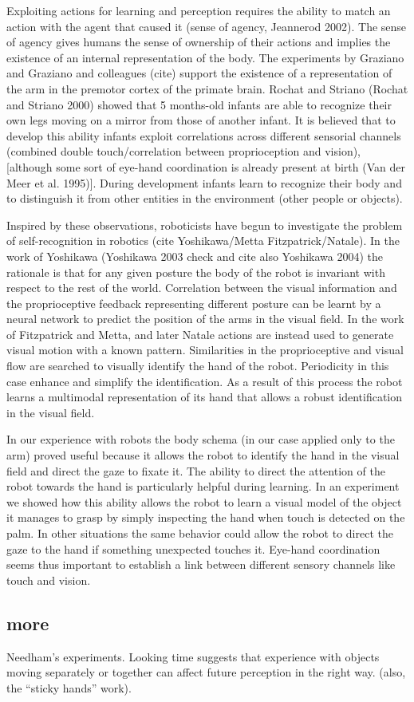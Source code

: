Exploiting actions for learning and perception requires the ability to match an action with the agent that caused it (sense of agency, Jeannerod 2002). The sense of agency gives humans the sense of ownership of their actions and implies the existence of an internal representation of the body. The experiments by Graziano and Graziano and colleagues (cite) support the existence of a representation of the arm in the premotor cortex of the primate brain. Rochat and Striano (Rochat and Striano 2000) showed that 5 months-old infants are able to recognize their own legs moving on a mirror from those of another infant. It is believed that to develop this ability infants exploit correlations across different sensorial channels (combined double touch/correlation between proprioception and vision), [although some sort of eye-hand coordination is already present at birth (Van der Meer et al. 1995)]. During development infants learn to recognize their body and to distinguish it from other entities in the environment (other people or objects). 

Inspired by these observations, roboticists have begun to investigate the problem of self-recognition in robotics (cite Yoshikawa/Metta Fitzpatrick/Natale). In the work of Yoshikawa (Yoshikawa 2003 check and cite also Yoshikawa 2004) the rationale is that for any given posture the body of the robot is invariant with respect to the rest of the world. Correlation between the visual information and the proprioceptive feedback representing different posture can be learnt by a neural network to predict the position of the arms in the visual field. In the work of Fitzpatrick and Metta, and later Natale actions are instead used to generate visual motion with a known pattern. Similarities in the proprioceptive and visual flow are searched to visually identify the hand of the robot. Periodicity in this case enhance and simplify the identification. As a result of this process the robot learns a multimodal representation of its hand that allows a robust identification in the visual field.

In our experience with robots the body schema (in our case applied only to the arm) proved useful because it allows the robot to identify the hand in the visual field and direct the gaze to fixate it. The ability to direct the attention of the robot towards the hand is particularly helpful during learning. In an experiment we showed how this ability allows the robot to learn a visual model of the object it manages to grasp by simply inspecting the hand when touch is detected on the palm. In other situations the same behavior could allow the robot to direct the gaze to the hand if something unexpected touches it. Eye-hand coordination seems thus important to establish a link between different sensory channels like touch and vision.

\subsection{more}

Needham's experiments. 
\cite{needham01object,needham97object}
Looking time suggests that experience with objects moving separately
or together can affect future perception in the right way.
(also, the ``sticky hands'' work).
